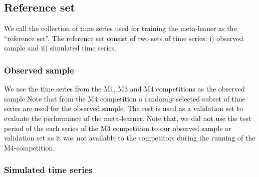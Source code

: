 \documentclass[11pt,a4paper,]{article}
\begin{document}
\hypertarget{reference-set}{%
\subsection{Reference set}\label{reference-set}}

We call the collection of time series used for training the meta-leaner as the ``reference set''. The reference set consist of two sets of time series: i) observed sample and ii) simulated time series.

\hypertarget{observed-sample}{%
\subsubsection{Observed sample}\label{observed-sample}}

We use the time series from the M1, M3 and M4 competitions as the observed sample.Note that from the M4 competition a randomly selected subset of time series are used for the observed sample. The rest is used as a validation set to evaluate the performance of the meta-learner. Note that, we did not use the test period of the each series of the M4 competition to our observed sample or validation set as it was not available to the competitors during the running of the M4-competition.

\hypertarget{simulated-time-series}{%
\subsubsection{Simulated time series}\label{simulated-time-series}}
\end{document}
